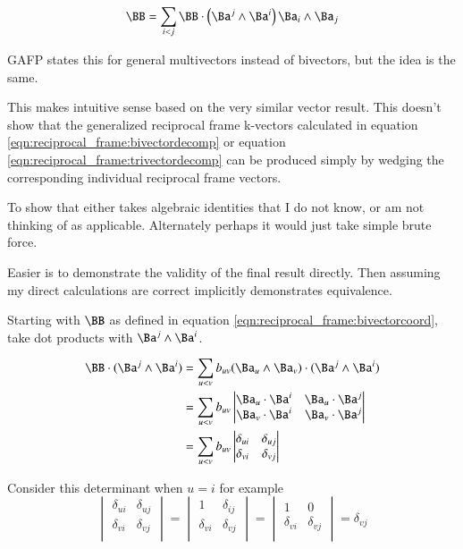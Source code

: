 \begin{equation}\label{eqn:reciprocal_frame:bivectordecompwithrecipbivector}
\BB = \sum_{i<j} \BB \cdot \left(\Ba^j \wedge \Ba^i\right) \Ba_i \wedge \Ba_j
\end{equation}

GAFP states this for general multivectors instead of bivectors, but the idea is the same.

This makes intuitive sense based on the very similar vector result.  This doesn't show that
the generalized reciprocal frame k-vectors calculated in 
equation \ref{eqn:reciprocal_frame:bivectordecomp} or equation \ref{eqn:reciprocal_frame:trivectordecomp} can be produced simply
by wedging the corresponding individual reciprocal frame vectors.

To show that either takes algebraic identities that I do not know, or am not thinking of as applicable.
Alternately perhaps it would just take simple brute force.

Easier is to demonstrate the validity of the final result directly.  Then assuming my direct calculations
are correct implicitly demonstrates equivalence.

Starting with $\BB$ as defined in equation \ref{eqn:reciprocal_frame:bivectorcoord}, take dot products with 
$\Ba^j \wedge \Ba^i$.

\begin{align*}
\BB \cdot (\Ba^j \wedge \Ba^i)
 &= \sum_{u<v} b_{uv} (\Ba_u \wedge \Ba_v) \cdot (\Ba^j \wedge \Ba^i) \\
 &= \sum_{u<v} b_{uv} 
\begin{vmatrix}
\Ba_u \cdot \Ba^i & \Ba_u \cdot \Ba^j \\
\Ba_v \cdot \Ba^i & \Ba_v \cdot \Ba^j \\
\end{vmatrix} \\
 &= \sum_{u<v} b_{uv} 
\begin{vmatrix}
\delta_{ui} & \delta_{uj} \\
\delta_{vi} & \delta_{vj} \\
\end{vmatrix} \\
\end{align*}

Consider this determinant when $u=i$ for example
\[
\begin{vmatrix}
\delta_{ui} & \delta_{uj} \\
\delta_{vi} & \delta_{vj} \\
\end{vmatrix} 
=
\begin{vmatrix}
1 & \delta_{ij} \\
\delta_{vi} & \delta_{vj} \\
\end{vmatrix}
=
\begin{vmatrix}
1 & 0 \\
\delta_{vi} & \delta_{vj} \\
\end{vmatrix}
= \delta_{vj}
\]


